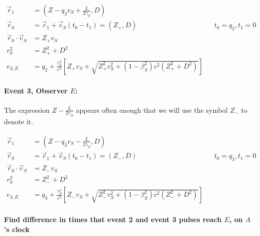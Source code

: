 \documentclass[a4paper]{article}
\theoremstyle{plain}
\theoremstyle{definition}
\newcommand{\vect}[1]{\vec{#1}}
\begin{document}
\begin{align}
\vect{r}_1 & = (Z - q_2v_S + \frac{L}{2\gamma_S}, D) \nonumber \\
\vect{r}_0 & = \vect{r}_1 + \vect{v}_S (t_0 - t_1) = (Z_{+}, D) & & \text{$t_0=q_2, t_1=0$} \nonumber \\
\vect{r}_0 \cdot \vect{v}_S & = Z_{+}v_S \\
r_0^2 & = Z_{+}^2 + D^2 \nonumber \\
e_{2,E} & = q_2 + \frac{\gamma_S^2}{c^2} \left[ Z_{+}v_S + \sqrt{ Z_{+}^2v_S^2 + (1-\beta_S^2)c^2(Z_{+}^2 + D^2) } \right] \nonumber
\end{align}


\paragraph{Event 3, Observer $E$:}

The expression $Z - \frac{L}{2\gamma_S}$ appears often enough that we
will use the symbol $Z_{-}$ to denote it.

\begin{align}
\vect{r}_1 & = (Z - q_3v_S - \frac{L}{2\gamma_S}, D) \nonumber \\
\vect{r}_0 & = \vect{r}_1 + \vect{v}_S (t_0 - t_1) = (Z_{-}, D) & & \text{$t_0=q_3, t_1=0$} \nonumber \\
\vect{r}_0 \cdot \vect{v}_S & = Z_{-}v_S \\
r_0^2 & = Z_{-}^2 + D^2 \nonumber \\
e_{3,E} & = q_3 + \frac{\gamma_S^2}{c^2} \left[ Z_{-}v_S + \sqrt{ Z_{-}^2v_S^2 + (1-\beta_S^2)c^2(Z_{-}^2 + D^2) } \right] \nonumber
\end{align}


\paragraph{Find difference in times that event 2 and event 3 pulses reach $E$, on $A$'s clock}
\end{document}
